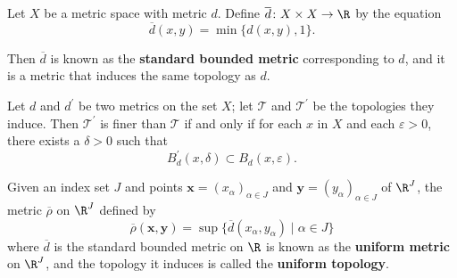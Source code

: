 \begin{theorem}
Let $X$ be a metric space with metric $d$. Define $\overline{d} \colon X \times X \rightarrow \R$ by the equation
\[
    \overline{d} (x, y) = \min \{ d(x, y), 1 \}. 
\]

Then $\overline{d}$ is known as the \textbf{standard bounded metric} corresponding to $d$, and it is a metric that
induces the same topology as $d$.
\end{theorem}

\begin{lemma}
Let $d$ and $d^{\prime}$ be two metrics on the set $X$; let $\mathscr{T}$ and $\mathscr{T}^{\prime}$ be the topologies they induce.
Then $\mathscr{T}^{\prime}$ is finer than $\mathscr{T}$ if and only if for each $x$ in $X$ and each $\varepsilon > 0$, there exists a $\delta > 0$ such that
\[
    B_d^{\prime}(x, \delta) \subset B_d(x, \varepsilon).
\]
\end{lemma}

\begin{definition}
Given an index set $J$ and points $\mathbf{x} = (x_\alpha)_{\alpha \in J}$ and $\mathbf{y} = (y_\alpha)_{\alpha \in J}$ of $\R^J$, the metric $\overline{\rho}$ on $\R^J$ defined by
\[
    \overline{\rho}(\mathbf{x} , \mathbf{y}) = \sup \{ \overline{d}(x_\alpha, y_\alpha) \mid \alpha \in J \}  
\]
where $\overline{d}$ is the standard bounded metric on $\R$ is known as the \textbf{uniform metric} on $\R^J$, and
the topology it induces is called the \textbf{uniform topology}.
\end{definition}


